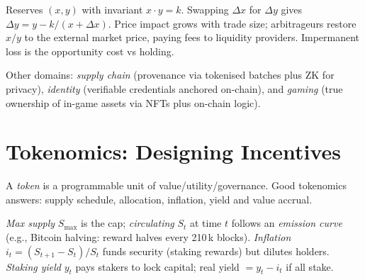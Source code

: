 \begin{example}\label{ex:amm}
Reserves $(x,y)$ with invariant $x\cdot y=k$. Swapping $\Delta x$ for $\Delta y$ gives $\Delta y = y - k/(x+\Delta x)$. Price impact grows with trade size; arbitrageurs restore $x/y$ to the external market price, paying fees to liquidity providers. Impermanent loss is the opportunity cost vs holding.
\end{example}

Other domains: \emph{supply chain} (provenance via tokenised batches plus ZK for privacy), \emph{identity} (verifiable credentials anchored on-chain), and \emph{gaming} (true ownership of in-game assets via NFTs plus on-chain logic).

\section{Tokenomics: Designing Incentives}\label{sec:tokenomics}
A \emph{token} is a programmable unit of value/utility/governance. Good tokenomics answers: supply schedule, allocation, inflation, yield and value accrual.

\begin{definition}\label{def:supply}
\emph{Max supply} $S_{\max}$ is the cap; \emph{circulating} $S_t$ at time $t$ follows an \emph{emission curve} (e.g., Bitcoin halving: reward halves every 210\,k blocks). \emph{Inflation} $i_t=(S_{t+1}-S_t)/S_t$ funds security (staking rewards) but dilutes holders. \emph{Staking yield} $y_t$ pays stakers to lock capital; real yield $=y_t - i_t$ if all stake.
\end{definition}

